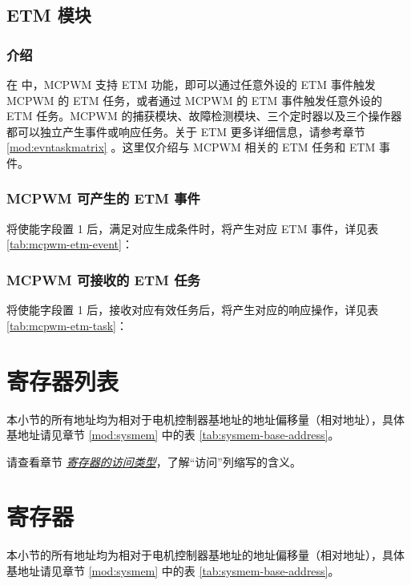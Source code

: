 \documentclass[main\_\_CN.tex]{subfiles}
\begin{document}
\subsection{ETM 模块}

\subsubsection{介绍}
在 \chipname{} 中，MCPWM 支持 ETM 功能，即可以通过任意外设的 ETM 事件触发 MCPWM 的 ETM 任务，或者通过 MCPWM 的 ETM 事件触发任意外设的 ETM 任务。MCPWM 的捕获模块、故障检测模块、三个定时器以及三个操作器都可以独立产生事件或响应任务。关于 ETM 更多详细信息，请参考章节 \ref{mod:evntaskmatrix} 。这里仅介绍与 MCPWM 相关的 ETM 任务和 ETM 事件。

\subsubsection{MCPWM 可产生的 ETM 事件}
将使能字段置 1 后，满足对应生成条件时，将产生对应 ETM 事件，详见表 \ref{tab:mcpwm-etm-event}：



\subsubsection{MCPWM 可接收的 ETM 任务}
将使能字段置 1 后，接收对应有效任务后，将产生对应的响应操作，详见表 \ref{tab:mcpwm-etm-task}：





\clearpage
\hypertarget{mcpwm-reg-summ}{}
\section{寄存器列表}
\label{sec:mcpwm-reg-summ}

本小节的所有地址均为相对于电机控制器基地址的地址偏移量（相对地址），具体基地址请见章节 \ref{mod:sysmem} \textit{} 中的表 \ref{tab:sysmem-base-address}。

请查看章节 \hyperref[glossary-access-types]{\textit{寄存器的访问类型}}，了解“访问”列缩写的含义。






\clearpage
\section{寄存器}

本小节的所有地址均为相对于电机控制器基地址的地址偏移量（相对地址），具体基地址请见章节 \ref{mod:sysmem} \textit{} 中的表 \ref{tab:sysmem-base-address}。


\end{document}
